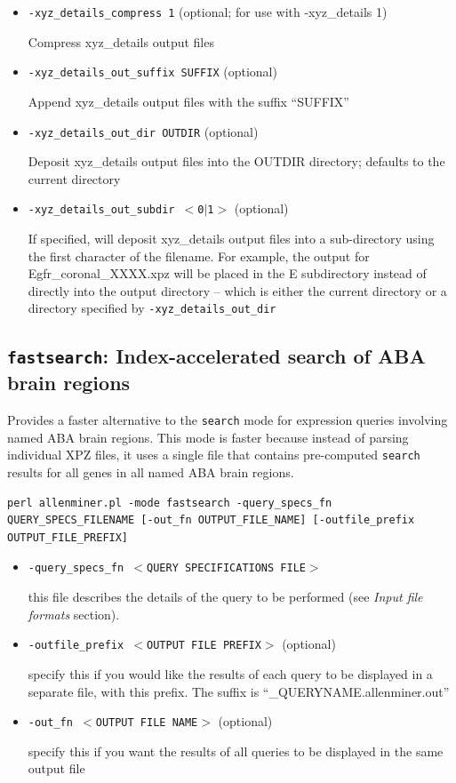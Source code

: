 \documentclass[10pt]{article}
\begin{document}
\begin{itemize}
\item {\tt -xyz\_details\_compress 1} (optional; for use with -xyz\_details 1)

Compress xyz\_details output files

\item {\tt -xyz\_details\_out\_suffix SUFFIX} (optional)

Append xyz\_details output files with the suffix ``SUFFIX''

\item {\tt -xyz\_details\_out\_dir OUTDIR} (optional)

Deposit xyz\_details output files into the OUTDIR directory; defaults to the current directory

\item {\tt -xyz\_details\_out\_subdir $<$0$|$1$>$} (optional)

If specified, will deposit xyz\_details output files into a sub-directory using the first character of the filename. For example, the output for Egfr\_coronal\_XXXX.xpz will be placed in the E subdirectory instead of directly into the output directory -- which is either the current directory or a directory specified by {\tt -xyz\_details\_out\_dir}

\end{itemize}

\subsection{{\tt fastsearch}: Index-accelerated search of ABA brain regions}

Provides a faster alternative to the {\tt search} mode for expression queries involving named ABA brain regions. This mode is faster because instead of parsing individual XPZ files, it uses a single file that contains pre-computed {\tt search} results for all genes in all named ABA brain regions.\\

\begin{lstlisting}
perl allenminer.pl -mode fastsearch -query_specs_fn QUERY_SPECS_FILENAME [-out_fn OUTPUT_FILE_NAME] [-outfile_prefix OUTPUT_FILE_PREFIX]
\end{lstlisting}

\begin{itemize}
\item {\tt -query\_specs\_fn $<$QUERY SPECIFICATIONS FILE$>$}

this file describes the details of the query to be performed (see {\it Input file formats} section).

\item {\tt -outfile\_prefix $<$OUTPUT FILE PREFIX$>$} (optional)

specify this if you would like the results of each query to be displayed in a separate file, with this prefix. The suffix is ``\_QUERYNAME.allenminer.out''

\item {\tt -out\_fn $<$OUTPUT FILE NAME$>$} (optional)

specify this if you want the results of all queries to be displayed in the same output file
\end{itemize}
\end{document}
